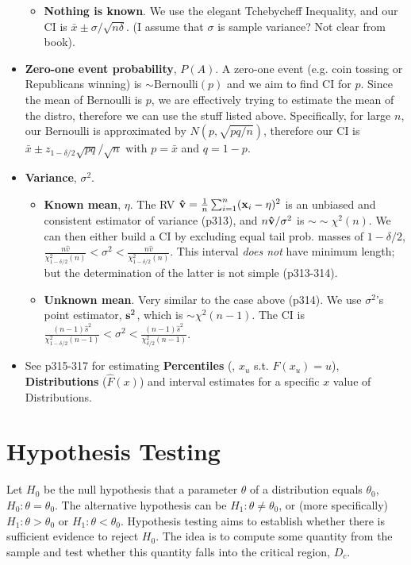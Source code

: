 \documentclass[a4paper]{book}
\begin{document}
\begin{itemize}
\begin{itemize}
	\item \textbf{Nothing is known}. We use the elegant Tchebycheff Inequality, and our CI is $\bar{x}\pm \sigma/\sqrt{n\delta}$. (I assume that $\sigma$ is sample variance? Not clear from book).
	\end{itemize}
\item \textbf{Zero-one event probability}, $P(A)$. A zero-one event (e.g. coin tossing or Republicans winning) is $\sim\text{Bernoulli}(p)$ and we aim to find CI for $p$. Since the mean of Bernoulli is $p$, we are effectively trying to estimate the mean of the distro, therefore we can use the stuff listed above. Specifically, for large $n$, our Bernoulli is approximated by $N(p, \sqrt{pq/n})$, therefore our CI is $\bar{x}\pm z_{1-\delta/2} \sqrt{pq}/\sqrt{n}$ with $p=\bar{x}$ and $q=1-p$.
\item \textbf{Variance}, $\sigma^2$.
	\begin{itemize}
	\item \textbf{Known mean}, $\eta$. The RV $\mathbf{\hat{v}}=\frac{1}{n}\sum_{i=1}^n(\mathbf{x}_i-\eta)^2$ is an unbiased and consistent estimator of variance (p313), and $n\mathbf{\hat{v}}/\sigma^2$ is $\sim\sim\chi^2(n)$. We can then either build a CI by excluding equal tail prob. masses of $1-\delta/2$, \ie $\frac{n\hat{v}}{\chi^2_{1-\delta/2}(n)}<\sigma^2<\frac{n\hat{v}}{\chi^2_{1-\delta/2}(n)}$. This interval \textit{does not} have minimum length; but the determination of the latter is not simple (p313-314).
	\item \textbf{Unknown mean}. Very similar to the case above (p314). We use $\sigma^2$'s point estimator, $\mathbf{s}^2$, which is $\sim\chi^2(n-1)$. The CI is $\frac{(n-1)\hat{s}^2}{\chi^2_{1-\delta/2}(n-1)}<\sigma^2<\frac{(n-1)\hat{s}^2}{\chi^2_{\delta/2}(n-1)}$.
	\end{itemize}
	\item See p315-317 for estimating \textbf{Percentiles} (\ie, $x_u$ s.t. $F(x_u)=u$), \textbf{Distributions} ($\hat{F}(x)$) and interval estimates for a specific $x$ value of Distributions. 
\end{itemize}




\section{Hypothesis Testing}
Let $H_0$ be the null hypothesis that a parameter $\theta$ of a distribution equals $\theta_0$, \ie $H_0 : \theta = \theta_0$. The alternative hypothesis can be $H_1:\theta \neq \theta_0$, or (more specifically) $H_1:\theta > \theta_0$ or $H_1:\theta < \theta_0$. Hypothesis testing aims to establish whether there is sufficient evidence to reject $H_0$. The idea is to compute some quantity from the sample and test whether this quantity falls into the critical region, $D_c$. 
\end{document}

